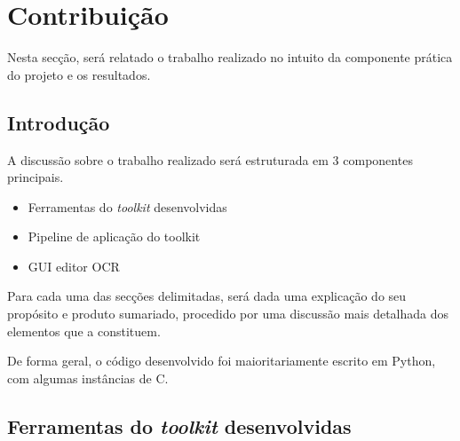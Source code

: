\chapter{Contribuição}
\label{cap_contribuicao}

Nesta secção, será relatado o trabalho realizado no intuito da componente prática do projeto e os resultados. 

\section{Introdução}

A discussão sobre o trabalho realizado será estruturada em 3 componentes principais.
\begin{itemize}
	\item Ferramentas do \textit{toolkit} desenvolvidas
	\item Pipeline de aplicação do toolkit
	\item GUI editor OCR
\end{itemize}

Para cada uma das secções delimitadas, será dada uma explicação do seu propósito e produto sumariado, procedido por uma discussão mais detalhada dos elementos que a constituem.

De forma geral, o código desenvolvido foi maioritariamente escrito em Python, com algumas instâncias de C.

\section{Ferramentas do \textit{toolkit} desenvolvidas}

